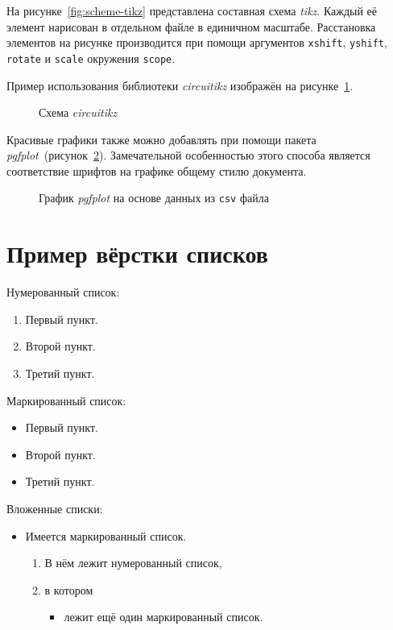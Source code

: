 На рисунке~\cref{fig:scheme-tikz} представлена составная схема \textit{tikz}.
Каждый её элемент нарисован в отдельном файле в единичном масштабе.
Расстановка элементов на рисунке производится при помощи аргументов \texttt{xshift},
\texttt{yshift}, \texttt{rotate} и \texttt{scale} окружения \texttt{scope}.

Пример использования библиотеки \textit{circuitikz} изображён на рисунке~\cref{fig:circuitikz}.

\begin{figure}[htbp]
        \centerfloat{
            
        }
        \caption{Схема \textit{circuitikz}}\label{fig:circuitikz}
\end{figure}

Красивые графики также можно добавлять при помощи пакета \textit{pgfplot}~(рисунок~\cref{fig:pgfplot}).
Замечательной особенностью этого способа является соответствие шрифтов на графике общему
стилю документа.

\begin{figure}[htbp]
        \centerfloat{
            
        }
        \caption{График \textit{pgfplot} на основе данных из \texttt{csv} файла}\label{fig:pgfplot}
\end{figure}


\section{Пример вёрстки списков}\label{sec:ch2/sec3}

\noindent Нумерованный список:
\begin{enumerate}
    \item Первый пункт.
    \item Второй пункт.
    \item Третий пункт.
\end{enumerate}

\noindent Маркированный список:
\begin{itemize}
    \item Первый пункт.
    \item Второй пункт.
    \item Третий пункт.
\end{itemize}

\noindent Вложенные списки:
\begin{itemize}
    \item Имеется маркированный список.
          \begin{enumerate}
              \item В нём лежит нумерованный список,
              \item в котором
                    \begin{itemize}
                        \item лежит ещё один маркированный список.
                    \end{itemize}
          \end{enumerate}
\end{itemize}

